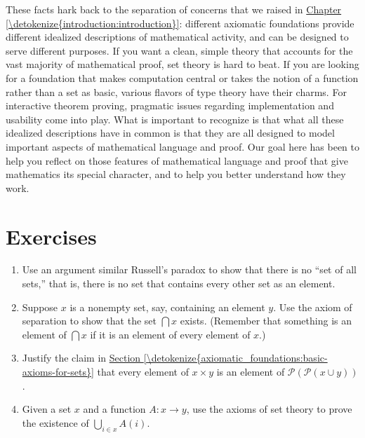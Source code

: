 \documentclass[letterpaper,10pt,english]{sphinxmanual}
\begin{document}
\sphinxAtStartPar
These facts hark back to the separation of concerns that we raised in \hyperref[\detokenize{introduction:introduction}]{Chapter \ref{\detokenize{introduction:introduction}}}: different axiomatic foundations provide different idealized descriptions of mathematical activity, and can be designed to serve different purposes. If you want a clean, simple theory that accounts for the vast majority of mathematical proof, set theory is hard to beat. If you are looking for a foundation that makes computation central or takes the notion of a function rather than a set as basic, various flavors of type theory have their charms. For interactive theorem proving, pragmatic issues regarding implementation and usability come into play. What is important to recognize is that what all these idealized descriptions have in common is that they are all designed to model important aspects of mathematical language and proof. Our goal here has been to help you reflect on those features of mathematical language and proof that give mathematics its special character, and to help you better understand how they work.


\section{Exercises}
\label{\detokenize{axiomatic_foundations:exercises}}\begin{enumerate}
%
\item {} 
\sphinxAtStartPar
Use an argument similar Russell’s paradox to show that there is no “set of all sets,” that is, there is no set that contains every other set as an element.

\item {} 
\sphinxAtStartPar
Suppose \(x\) is a nonempty set, say, containing an element \(y\). Use the axiom of separation to show that the set \(\bigcap x\) exists. (Remember that something is an element of \(\bigcap x\) if it is an element of every element of \(x\).)

\item {} 
\sphinxAtStartPar
Justify the claim in \hyperref[\detokenize{axiomatic_foundations:basic-axioms-for-sets}]{Section \ref{\detokenize{axiomatic_foundations:basic-axioms-for-sets}}} that every element of \(x \times y\) is an element of \(\mathcal P (\mathcal P (x \cup y))\).

\item {} 
\sphinxAtStartPar
Given a set \(x\) and a function \(A : x \to y\), use the axioms of set theory to prove the existence of \(\bigcup_{i \in x} A(i)\).

\end{enumerate}
\end{document}
